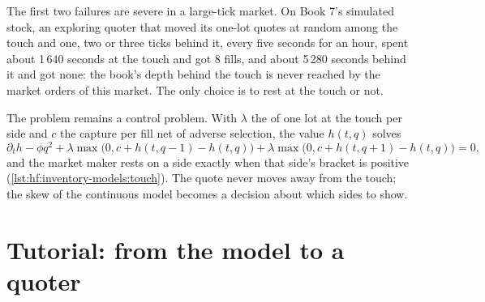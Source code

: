 The first two failures are severe in a large-tick market. On Book 7's simulated stock, an exploring quoter that moved its one-lot quotes at random
among the touch and one, two or three ticks behind it, every five seconds for an hour, spent about 1\,640 seconds at the touch and got 8 fills, and
about 5\,280 seconds behind it and got none: the book's depth behind the touch is never reached by the market orders of this market. The only
choice is to rest at the touch or not.

The problem remains a control problem. With $\lambda$ the  of one lot at the touch per side and $c$ the capture per fill net of
adverse selection, the value $h(t,q)$ solves
\[
\partial_th-\phi q^2+\lambda\max\bigl(0,c+h(t,q-1)-h(t,q)\bigr)+\lambda\max\bigl(0,c+h(t,q+1)-h(t,q)\bigr)=0,
\]
and the market maker rests on a side exactly when that side's bracket is positive (\cref{lst:hf:inventory-models:touch}). The quote never moves
away from the touch; the skew of the continuous model becomes a decision about which sides to show.

\section{Tutorial: from the model to a quoter}\label{tut:hf:inventory-models:tut}


